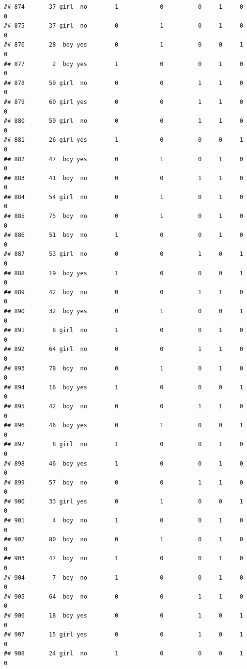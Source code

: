 \documentclass[man]{apa6}
\begin{document}
\begin{verbatim}
## 874       37 girl  no        1            0          0     1     0     0
## 875       37 girl  no        0            1          0     1     0     0
## 876       28  boy yes        0            1          0     0     1     0
## 877        2  boy yes        1            0          0     1     0     0
## 878       59 girl  no        0            0          1     1     0     0
## 879       60 girl yes        0            0          1     1     0     0
## 880       59 girl  no        0            0          1     1     0     0
## 881       26 girl yes        1            0          0     0     1     0
## 882       47  boy yes        0            1          0     1     0     0
## 883       41  boy  no        0            0          1     1     0     0
## 884       54 girl  no        0            1          0     1     0     0
## 885       75  boy  no        0            1          0     1     0     0
## 886       51  boy  no        1            0          0     1     0     0
## 887       53 girl  no        0            0          1     0     1     0
## 888       19  boy yes        1            0          0     0     1     0
## 889       42  boy  no        0            0          1     1     0     0
## 890       32  boy yes        0            1          0     0     1     0
## 891        8 girl  no        1            0          0     1     0     0
## 892       64 girl  no        0            0          1     1     0     0
## 893       78  boy  no        0            1          0     1     0     0
## 894       16  boy yes        1            0          0     0     1     0
## 895       42  boy  no        0            0          1     1     0     0
## 896       46  boy yes        0            1          0     0     1     0
## 897        8 girl  no        1            0          0     1     0     0
## 898       46  boy yes        1            0          0     1     0     0
## 899       57  boy  no        0            0          1     1     0     0
## 900       33 girl yes        0            1          0     0     1     0
## 901        4  boy  no        1            0          0     1     0     0
## 902       80  boy  no        0            1          0     1     0     0
## 903       47  boy  no        1            0          0     1     0     0
## 904        7  boy  no        1            0          0     1     0     0
## 905       64  boy  no        0            0          1     1     0     0
## 906       18  boy yes        0            0          1     0     1     0
## 907       15 girl yes        0            0          1     0     1     0
## 908       24 girl  no        1            0          0     0     1     0

\end{verbatim}
\end{document}
